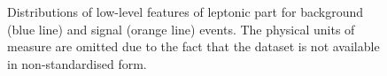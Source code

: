 \documentclass[xcolor=table,8pt]{beamer}
\begin{document}
\begin{frame}[t]
\begin{figure}[!h]
\begin{minipage}[c]{0.333\linewidth}
{                    \label{fig:appendix_low_features_leptonic_miss_E_phi}
                }
            \end{minipage}%
            \begin{minipage}[c]{0.165\linewidth}
                \vspace{0pt}%
                \hfill%
            \end{minipage}%
            \vspace{-2pt}
            \caption{Distributions of low-level features of leptonic part for background (blue line) and signal (orange line) events. The physical units of measure are omitted due to the fact that the dataset is not available in non-standardised form.}
            \label{fig:appendix_low_features_leptonic}
        \end{figure}
    \end{frame}
    
    
\end{document}
